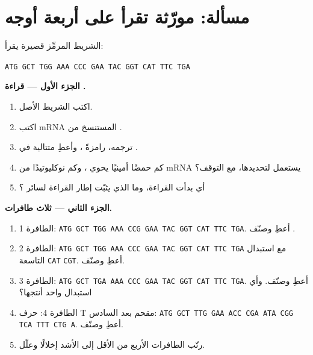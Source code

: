 \section{مسألة: مورّثة تقرأ على أربعة أوجه}

\begin{problem}
\label{pb:g11:gene-expression:1}
الشريط المرمِّز  قصيرة يقرأ:
\begin{center}
\texttt{ATG GCT TGG AAA CCC GAA TAC GGT CAT TTC TGA}
\end{center}

\medskip
\noindent\textbf{الجزء الأول --- قراءة .}
\begin{enumerate}
  \item اكتب الشريط الأصل.
  \item اكتب mRNA المستنسخ من .
  \item ترجمه، رامزةً ، وأعطِ متتالية  في
        .
  \item كم حمضًا أمينيًا يحوي ، وكم نوكليوتيدًا من mRNA يستعمل
        لتحديدها، مع  التوقف؟
  \item أي  بدأت القراءة، وما الذي يثبّت إطار القراءة لسائر
        ؟
\end{enumerate}

\medskip
\noindent\textbf{الجزء الثاني --- ثلاث طافرات.}
\begin{enumerate}[resume]
  \item الطافرة 1: \texttt{ATG GCT TGG AAA CCG GAA TAC GGT CAT TTC TGA}.
        أعطِ  وصنّف .
  \item الطافرة 2: \texttt{ATG GCT TGG AAA CCC GAA TAC GGT CAT TTC TGA}
        مع استبدال  التاسعة \texttt{CAT}  \texttt{CGT}.
        أعطِ  وصنّف.
  \item الطافرة 3: \texttt{ATG GCT TGA AAA CCC GAA TAC GGT CAT TTC TGA}.
        أعطِ  وصنّف. وأي استبدال واحد أنتجها؟
  \item الطافرة 4: حرف T مقحم بعد  السادس:
        \texttt{ATG GCT TTG GAA ACC CGA ATA CGG TCA TTT CTG A}. أعطِ
         وصنّف.
  \item رتّب الطافرات الأربع من الأقل إلى الأشد إخلالًا 
        وعلّل.
\end{enumerate}


\end{problem}
